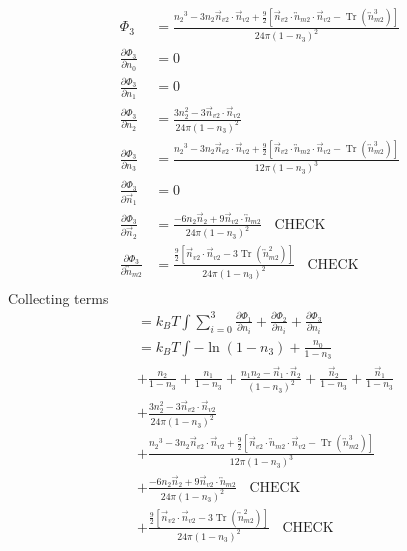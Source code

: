 \documentclass[double,12pt]{revtex4-2}
\begin{document}
\begin{align}
  \Phi_3 &= \frac{{n_2}^3-3n_2\vec n_{v2}\cdot\vec n_{v2}+\frac{9}{2}
       [\vec n_{v2}\cdot{\overleftrightarrow{n}_{m2}}\cdot{\vec n_{v2}}
       -\operatorname{Tr}({\overleftrightarrow n^3_{m2}})]}{24\pi(1-n_3)^2}   \\
  \frac{\partial \Phi_3}{\partial n_0} &= 0   \\
  \frac{\partial \Phi_3}{\partial n_1} &= 0   \\
  \frac{\partial \Phi_3}{\partial n_2} &=  \frac{3n_2^2-3\vec n_{v2}\cdot\vec n_{v2}}{24\pi(1-n_3)^2}  \\
  \frac{\partial \Phi_3}{\partial n_3} &=  \frac{{n_2}^3-3n_2\vec n_{v2}\cdot\vec n_{v2}+\frac{9}{2}
       [\vec n_{v2}\cdot{\overleftrightarrow{n}_{m2}}\cdot{\vec n_{v2}}
       -\operatorname{Tr}({\overleftrightarrow n^3_{m2}})]}{12\pi(1-n_3)^3}  \\
  \frac{\partial \Phi_3}{\partial \vec n_1} &=  0  \\
  \frac{\partial \Phi_3}{\partial \vec n_2} &= \frac{-6n_2\vec n_2 +9\vec n_{v2}\cdot{\overleftrightarrow{n}_{m2}}}{24\pi(1-n_3)^2} ~~~~\text{CHECK} \\
  \frac{\partial \Phi_3}{\partial \overleftrightarrow  n_{m2}} &= \frac{\frac{9}{2}
       [\vec n_{v2}\cdot{\vec n_{v2}}
       -3\operatorname{Tr}({\overleftrightarrow n^2_{m2}})]}{24\pi(1-n_3)^2}   ~~~~\text{CHECK} \\
\end{align}
Collecting terms
\begin{align}
 &= k_BT\int \sum_{i=0}^3 \frac{\partial \Phi_1}{\partial n_i} + \frac{\partial \Phi_2}{\partial n_i} 
  + \frac{\partial \Phi_3}{\partial n_i} \\
 &= k_BT\int -\ln\left(1-n_3\right) + \frac{n_0}{1-n_3}      \\
%
&+ \frac{n_2}{1-n_3} + \frac{n_1}{1-n_3} + \frac{n_1n_2-\vec n_1\cdot\vec n_2}{\left(1-n_3\right)^2} 
+ \frac{\vec n_2}{1-n_3} + \frac{\vec n_1}{1-n_3}  \\
%  
 &+ \frac{3n_2^2-3\vec n_{v2}\cdot\vec n_{v2}}{24\pi(1-n_3)^2}  \\
 &+ \frac{{n_2}^3-3n_2\vec n_{v2}\cdot\vec n_{v2}+\frac{9}{2}
       [\vec n_{v2}\cdot{\overleftrightarrow{n}_{m2}}\cdot{\vec n_{v2}}
       -\operatorname{Tr}({\overleftrightarrow n^3_{m2}})]}{12\pi(1-n_3)^3}  \\
&+ \frac{-6n_2\vec n_2 +9\vec n_{v2}\cdot{\overleftrightarrow{n}_{m2}}}{24\pi(1-n_3)^2} ~~~~\text{CHECK} \\
&+ \frac{\frac{9}{2}[\vec n_{v2}\cdot{\vec n_{v2}}
       -3\operatorname{Tr}({\overleftrightarrow n^2_{m2}})]}{24\pi(1-n_3)^2}   ~~~~\text{CHECK} \\
\end{align}
\end{document}
